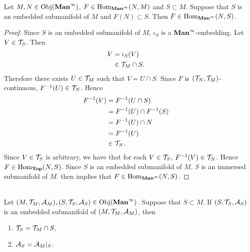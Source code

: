 \documentclass{book}
\begin{document}
	\begin{ex} 
		Let $M, N \in \operatorname{Obj}(\operatorname*{\text{\textbf{Man}}^{\infty}})$, $F \in \operatorname{Hom}_{\operatorname*{\text{\textbf{Man}}^{\infty}}}(N, M)$ and $S \subset M$. Suppose that $S$ is an embedded submanifold of $M$ and $F(N) \subset S$. Then $F \in \operatorname{Hom}_{\operatorname*{\text{\textbf{Man}}^{\infty}}}(N, S)$.
	\end{ex}

	\begin{proof}
		Since $S$ is an embedded submanifold of $M$, $\iota_S$ is a $\operatorname*{\text{\textbf{Man}}^{\infty}}$-embedding. Let $V \in \mathcal{T}_S$. Then 
		\begin{align*}
			V
			& = \iota_S(V) \\
			& \in \mathcal{T}_M \cap S.
		\end{align*} 
		Therefore there exists $U \in \mathcal{T}_M$ such that $V = U \cap S$. Since $F$ is $(\mathcal{T}_N, \mathcal{T}_M)$-continuous, $F^{-1}(U) \in \mathcal{T}_N$. Hence  
		\begin{align*}
			F^{-1}(V)
			& = F^{-1}(U \cap S) \\
			& = F^{-1}(U) \cap F^{-1}(S) \\
			& = F^{-1}(U) \cap N \\
			& = F^{-1}(U) \\
			& \in \mathcal{T}_N.
		\end{align*}
		Since $V \in \mathcal{T}_S$ is arbitrary, we have that for each $V \in \mathcal{T}_S$, $F^{-1}(V) \in \mathcal{T}_N$. Hence $F \in \operatorname{Hom}_{\operatorname*{\text{\textbf{Top}}}}(N, S)$. Since $S$ is an embedded submanifold of $M$, $S$ is an immersed submanifold of $M$.  then implies that $F \in \operatorname{Hom}_{\operatorname*{\text{\textbf{Man}}^{\infty}}}(N, S)$.
	\end{proof}

	\begin{ex}   \\
		Let $(M, \mathcal{T}_M, \mathcal{A}_M), (S, \mathcal{T}_S, \mathcal{A}_S) \in \operatorname{Obj}(\operatorname*{\text{\textbf{Man}}^{\infty}})$. Suppose that $S \subset M$. If $(S, \mathcal{T}_S, \mathcal{A}_S)$ is an embedded submanifold of $(M, \mathcal{T}_M, \mathcal{A}_M)$, then 
		\begin{enumerate}
			\item $\mathcal{T}_S = \mathcal{T}_M \cap S$,
			\item $\mathcal{A}_S = \mathcal{A}_M|_S$.
		\end{enumerate}
	\end{ex}
\end{document}
